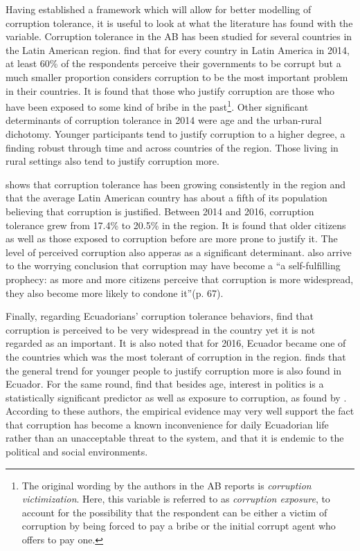 \documentclass[12pt,a4]{article}\usepackage[]{graphicx}\usepackage[]{xcolor}
\begin{document}
Having established a framework which will allow for better modelling of corruption tolerance, it is useful to look at what the literature has found with the variable. Corruption tolerance in the AB has been studied for several countries in the Latin American region. \textcite{Singer.2016} find that for every country in Latin America in 2014, at least 60\% of the respondents perceive their governments to be corrupt but a much smaller proportion considers corruption to be the most important problem in their countries. It is found that those who justify corruption are those who have been exposed to some kind of bribe in the past\footnote{The original wording by the authors in the AB reports is \textit{corruption victimization}. Here, this variable is referred to as \textit{corruption exposure}, to account for the possibility that the respondent can be either a victim of corruption by being forced to pay a bribe or the initial corrupt agent who offers to pay one.}. Other significant determinants of corruption tolerance in 2014 were age and the urban-rural dichotomy. Younger participants tend to justify corruption to a higher degree, a finding robust through time and across countries of the region. Those living in rural settings also tend to justify corruption more.

\textcite{Lupu.2017} shows that corruption tolerance has been growing consistently in the region and that the average Latin American country has about a fifth of its population believing that corruption is justified. Between 2014 and 2016, corruption tolerance grew from 17.4\% to 20.5\% in the region. It is found that older citizens as well as those exposed to corruption before are more prone to justify it. The level of perceived corruption also apperas as a significant determinant. \textcite{Lupu.2017} also arrive to the worrying conclusion that corruption may have become a \enquote{a self-fulfilling prophecy: as more and more citizens perceive that corruption is more widespread, they also become more likely to condone it}(p. 67). 

Finally, regarding Ecuadorians' corruption tolerance behaviors, \textcite{Moscoso.2018} find that corruption is perceived to be very widespread in the country yet it is not regarded as an important. It is also noted that for 2016, Ecuador became one of the countries which was the most tolerant of corruption in the region. \textcite{Montalvo.2019} finds that the general trend for younger people to justify corruption more is also found in Ecuador. For the same round, \textcite{Moscoso.2020} find that besides age, interest in politics is a statistically significant predictor as well as exposure to corruption, as found by \textcite{Lupu.2017}. According to these authors, the empirical evidence may very well support the fact that corruption has become a known inconvenience for daily Ecuadorian life rather than an unacceptable threat to the system, and that it is endemic to the political and social environments. 
\end{document}
